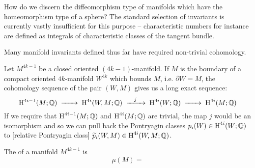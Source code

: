 How do we discern the diffeomorphism type of manifolds which have the homeomorphism type of a sphere? The standard selection of invariants is currently vastly insufficient for this purpose -- characteristic numbers for instance are defined as integrals of characteristic classes of the tangent bundle.


Many manifold invariants defined thus far have required non-trivial cohomology. 




Let $M^{4k-1}$ be a closed oriented $(4k-1)$-manifold. If $M$ is the boundary of a compact oriented $4k$-manifold $W^{4k}$ which bounds $M$, i.e. $\partial W = M$, the cohomology sequence of the pair $(W,M)$ gives us a long exact sequence:
\[
  \H^{4i-1}(M;\Q) \lkxto \H^{4i}(W, M; \Q) \lkxto[j] \H^{4i}(W; \Q) \lkxto \H^{4i}(M; \Q)
\]
If we require that $\operatorname{H}^{4i-1}(M;\mathbb{Q})$ and $\operatorname{H}^{4i}(M;\mathbb{Q})$ are trivial, the map $j$ would be an isomorphism and so we can pull back the Pontryagin classes $p_i(W)\in \operatorname{H}^{4i}(W;\mathbb{Q})$ to [relative Pontryagin class] $\widetilde{p}_i(W, M)\in\operatorname{H}^{4i}(W, M; \mathbb{Q})$.

\begin{definition}
	The  of a manifold $M^{4k-1}$ is
	\[
    \mu(M) = 
	\]
\end{definition}
